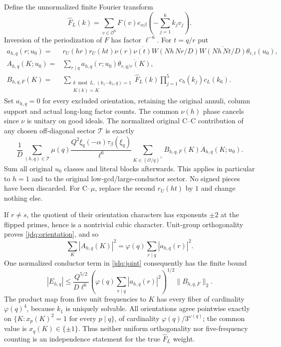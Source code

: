 Define the unnormalized finite Fourier transform
\[
 \widehat F_L(k)=\sum_{v\in\mathcal O^6}F(v)
             e_{\alpha\beta}\!\left(-\sum_{j=1}^6k_jv_j\right).
\]
Inversion of the periodization of $F$ has factor $\ell^{-6}$.
For $t=q/r$ put
\begin{align*}
 a_{h,q}(r;u_0)={}&r_U(hr)r_U(ht)\nu(r)\overline{\nu(t)}
 W(Nh\,Nr/D)\overline{W(Nh\,Nt/D)}\theta_{r,t}(u_0),\\
 A_{h,q}(K;u_0)={}&\sum_{r\mid q}a_{h,q}(r;u_0)
                         \overline{\theta_{r,q/r}(K)},\\
 B_{h,q,F}(K)={}&
 \sum_{\substack{k\bmod L,\ (k_1\cdots k_5,q)=1\\K(k)=K}}
 \widehat F_L(k)\prod_{j=1}^5c_h(k_j)c_L(k_6).
\end{align*}
Set $a_{h,q}=0$ for every excluded orientation, retaining the original
annuli, column support and actual long-long factor counts.
The common $\nu(h)$ phase cancels since $\nu$ is unitary on good ideals.
The normalized original C--C contribution of any chosen off-diagonal
sector $\mathcal T$ is exactly
\begin{equation}\label{jdq:joint}
 \frac1D\sum_{(h,q)\in\mathcal T}
 \mu(q)\frac{Q^2\xi_q(-\alpha)\tau_\beta(\xi_q)}{\ell^6}
 \sum_{K\in(\mathcal O/q)^\times}B_{h,q,F}(K)A_{h,q}(K;u_0).
\end{equation}
Sum all original $u_0$ classes and literal blocks afterwards.
This applies in particular to $h=1$ and to the original
low-gcd/large-conductor sector. No signed pieces have been discarded.
For C--$\mu$, replace the second $r_U(ht)$ by $1$ and change nothing else.

If $r\ne s$, the quotient of their orientation characters has
exponents $\pm2$ at the flipped primes, hence is a nontrivial cubic
character. Unit-group orthogonality proves
\eqref{jdq:orientation}, and so
\[
 \sum_K|A_{h,q}(K)|^2=\varphi(q)\sum_{r\mid q}|a_{h,q}(r)|^2.
\]
One normalized conductor term in \eqref{jdq:joint} consequently has the
finite bound
\begin{equation}\label{jdq:budget}
 |E_{h,q}|\le\frac{Q^{5/2}}{D\ell^6}
 \left(\varphi(q)\sum_{r\mid q}|a_{h,q}(r)|^2\right)^{1/2}
 \|B_{h,q,F}\|_2.
\end{equation}
The product map from five unit frequencies to $K$ has every fiber of
cardinality $\varphi(q)^4$, because $k_1$ is uniquely solvable.
All orientations agree pointwise exactly on
$\{K:x_p(K)^2=1\text{ for every }p\mid q\}$, of cardinality
$\varphi(q)/3^{\omega(q)}$; the common value is $x_q(K)\in\{\pm1\}$.
Thus neither uniform orthogonality nor five-frequency counting is an
independence statement for the true $\widehat F_L$ weight.

